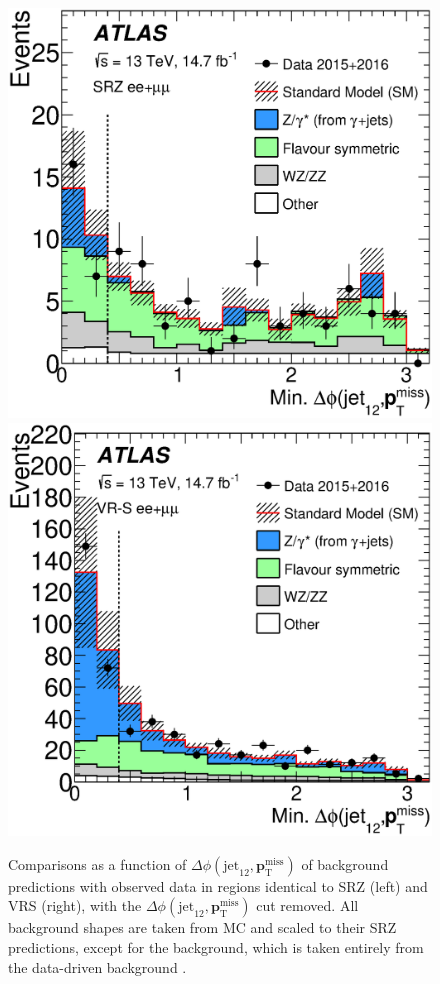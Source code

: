 \begin{centering}
\begin{figure}[!hbt]
\myfloatalign
\includegraphics[width=.9\linewidth]{figures/results/dPhi_azmet_ee+mm_onz_SR.eps}
\includegraphics[width=.9\linewidth]{figures/results/dPhi_azmet_ee+mm_onz_VR.eps}
\caption{Comparisons as a function of $\Delta\phi(\text{jet}_{12},{\boldsymbol p}_{\mathrm{T}}^\mathrm{miss})$ of background predictions with observed data in regions identical to SRZ (left) and VRS (right), with the $\Delta\phi(\text{jet}_{12},{\boldsymbol p}_{\mathrm{T}}^\mathrm{miss})$ cut removed. All background shapes are taken from \ac{MC} and scaled to their SRZ predictions, except for the \dyjets background, which is taken entirely from the data-driven background \cite{this_paper}.}
\label{fig:results_dphi}
\end{figure}
\end{centering}

